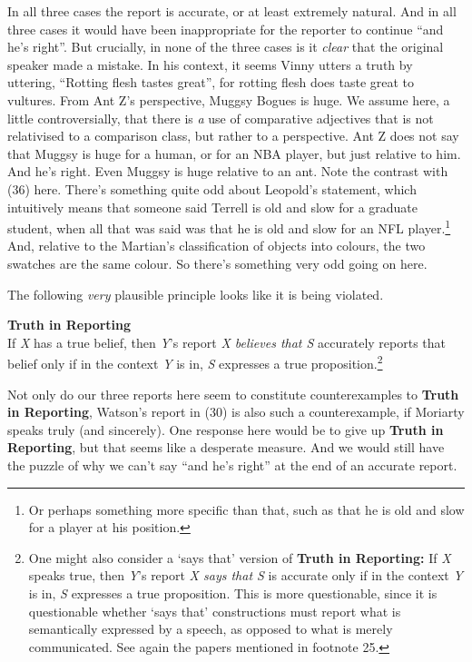 \documentclass[
  11pt,
  letterpaper,
  DIV=11,
  numbers=noendperiod]{scrartcl}
\begin{document}
In all three cases the report is accurate, or at least extremely
natural. And in all three cases it would have been inappropriate for the
reporter to continue ``and he's right''. But crucially, in none of the
three cases is it \emph{clear} that the original speaker made a mistake.
In his context, it seems Vinny utters a truth by uttering, ``Rotting
flesh tastes great'', for rotting flesh does taste great to vultures.
From Ant Z's perspective, Muggsy Bogues is huge. We assume here, a
little controversially, that there is \emph{a} use of comparative
adjectives that is not relativised to a comparison class, but rather to
a perspective. Ant Z does not say that Muggsy is huge for a human, or
for an NBA player, but just relative to him. And he's right. Even Muggsy
is huge relative to an ant. Note the contrast with (36) here. There's
something quite odd about Leopold's statement, which intuitively means
that someone said Terrell is old and slow for a graduate student, when
all that was said was that he is old and slow for an NFL
player.\footnote{Or perhaps something more specific than that, such as
  that he is old and slow for a player at his position.} And, relative
to the Martian's classification of objects into colours, the two
swatches are the same colour. So there's something very odd going on
here.

The following \emph{very} plausible principle looks like it is being
violated.

\textbf{Truth in Reporting}\\
If \emph{X} has a true belief, then \emph{Y}'s report \emph{X believes
that S} accurately reports that belief only if in the context \emph{Y}
is in, \emph{S} expresses a true proposition.\footnote{One might also
  consider a `says that' version of \textbf{Truth in Reporting:} If
  \emph{X} speaks true, then \emph{Y}'s report \emph{X says that S} is
  accurate only if in the context \emph{Y} is in, \emph{S} expresses a
  true proposition. This is more questionable, since it is questionable
  whether `says that' constructions must report what is semantically
  expressed by a speech, as opposed to what is merely communicated. See
  again the papers mentioned in footnote 25.}

Not only do our three reports here seem to constitute counterexamples to
\textbf{Truth in Reporting}, Watson's report in (30) is also such a
counterexample, if Moriarty speaks truly (and sincerely). One response
here would be to give up \textbf{Truth in Reporting}, but that seems
like a desperate measure. And we would still have the puzzle of why we
can't say ``and he's right'' at the end of an accurate report.
\end{document}
